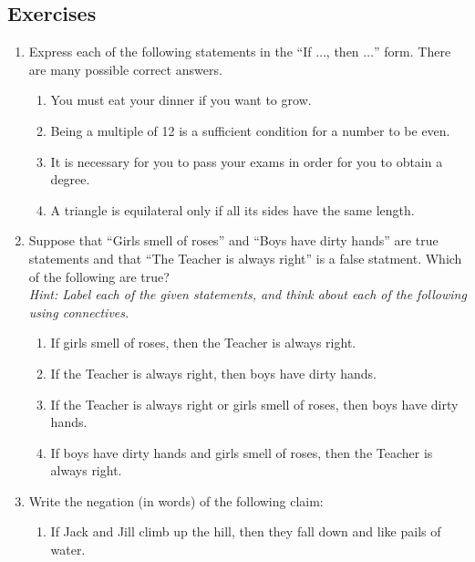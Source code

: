 \subsection*{Exercises}

\begin{enumerate}\renewcommand{\labelenumi}{\thesubsection.\theenumi}  
  \item Express each of the following statements in the ``If $\dots$, then $\dots$'' form. There are many possible correct answers.\prelistskip
		\begin{enumerate}
	  	\item You must eat your dinner if you want to grow.
	  	\item Being a multiple of 12 is a sufficient condition for a number to be even.
	  	\item It is necessary for you to pass your exams in order for you to obtain a degree. 
	  	\item A triangle is equilateral only if all its sides have the same length.
		\end{enumerate}\goodbreak
	
  \item Suppose that ``Girls smell of roses'' and ``Boys have dirty hands'' are true statements and that ``The Teacher is always right'' is a false statment. Which of the following are true?\\
  \emph{Hint: Label each of the given statements, and think about each of the following using connectives.}\prelistskip
		\begin{enumerate}
	  	\item If girls smell of roses, then the Teacher is always right.
	  	\item If the Teacher is always right, then boys have dirty hands.
	  	\item If the Teacher is always right or girls smell of roses, then boys have dirty hands.
	  	\item If boys have dirty hands and girls smell of roses, then the Teacher is always right.
		\end{enumerate}
	
  \item Write the negation (in words) of the following claim:\prelistskip
		\begin{enumerate}\setlength{\itemsep}{0pt}
		  \item[] If Jack and Jill climb up the hill, then they fall down and like pails of water. 
		\end{enumerate}


\end{enumerate}
